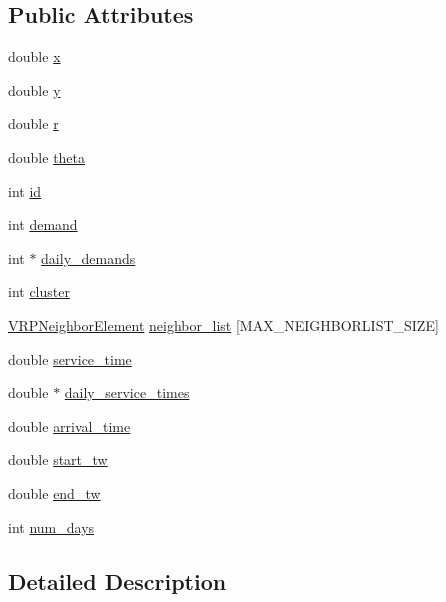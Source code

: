 \subsection*{Public Attributes}
\begin{DoxyCompactItemize}
\item 
double \hyperlink{class_v_r_p_node_a7a6f7729d65b17532ba940c0f5ac9d84}{x}
\item 
double \hyperlink{class_v_r_p_node_ab3a03e6bbe9fb324759428fa457b38dd}{y}
\item 
double \hyperlink{class_v_r_p_node_ac70ecfc9bd16dbc8814305eea16df1ed}{r}
\item 
double \hyperlink{class_v_r_p_node_a67007952897382052c524555c04ad57a}{theta}
\item 
int \hyperlink{class_v_r_p_node_a326a7068d690791bf8bc92587845efe8}{id}
\item 
int \hyperlink{class_v_r_p_node_a87e5e877816902bb1e21698ff0be26ac}{demand}
\item 
int $\ast$ \hyperlink{class_v_r_p_node_a0ccb1affe2876d292a7a64246a29a803}{daily\_\-demands}
\item 
int \hyperlink{class_v_r_p_node_afff481f6b2897843ddc0b51f335b0553}{cluster}
\item 
\hyperlink{class_v_r_p_neighbor_element}{VRPNeighborElement} \hyperlink{class_v_r_p_node_a549274ca67660efc1ce57f88c2e81646}{neighbor\_\-list} \mbox{[}MAX\_\-NEIGHBORLIST\_\-SIZE\mbox{]}
\item 
double \hyperlink{class_v_r_p_node_aec6d87eb84084a6392893af499212ec4}{service\_\-time}
\item 
double $\ast$ \hyperlink{class_v_r_p_node_a73ee95bbf4e7c5378e26fa473b568627}{daily\_\-service\_\-times}
\item 
double \hyperlink{class_v_r_p_node_a20d7890f8140b36b015d719df83d0ce3}{arrival\_\-time}
\item 
double \hyperlink{class_v_r_p_node_aa04306e567bc57da1a4d2002ab27af77}{start\_\-tw}
\item 
double \hyperlink{class_v_r_p_node_a2ffafc22b3e6315d8796f3bbed964b19}{end\_\-tw}
\item 
int \hyperlink{class_v_r_p_node_a7227a60538a6ce18325bc3ce9db0e70b}{num\_\-days}
\end{DoxyCompactItemize}


\subsection{Detailed Description}


